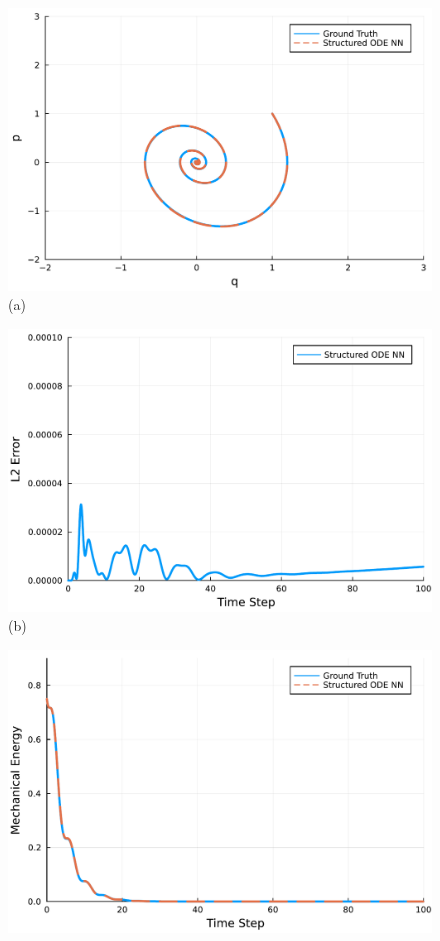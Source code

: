 \documentclass[
	parskip, 			   %
	twoside, 			   %
	DIV=14, 			   %
	BCOR=15.0mm, 		   %
	headsepline, 		   %
	open=right, 		   %
	captions=tableheading, %
	bibliography=totoc,    %
	numbers=noenddot       %
]{scrreprt}
\begin{document}
\begin{figure}[h!]
    \centering
    \begin{minipage}{.3\textwidth}
    \centering
    \includegraphics[width=1\linewidth]{figures/phase_portrait_compositional_idho.pdf}
    \\(a)
    \end{minipage}%
    \begin{minipage}{.3\textwidth}
    \centering
    \includegraphics[width=1\linewidth]{figures/prediction_error_compositional_idho.pdf}
    \\(b)
    \end{minipage}%
    \begin{minipage}{.3\textwidth}
    \centering
    \includegraphics[width=1\linewidth]{figures/Hamiltonian_evolution_compositional_idho.pdf}

\end{minipage}
\end{figure}
\end{document}
